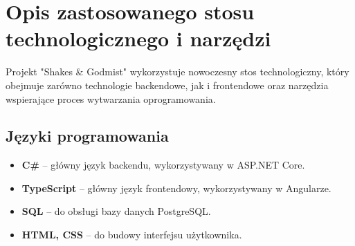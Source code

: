 \chapter{Opis zastosowanego stosu technologicznego i narzędzi}

Projekt "Shakes \& Godmist" wykorzystuje nowoczesny stos technologiczny, który obejmuje zarówno technologie backendowe, jak i frontendowe oraz narzędzia wspierające proces wytwarzania oprogramowania.

\section{Języki programowania}
\begin{itemize}
    \item \textbf{C\#} -- główny język backendu, wykorzystywany w ASP.NET Core.
    \item \textbf{TypeScript} -- główny język frontendowy, wykorzystywany w Angularze.
    \item \textbf{SQL} -- do obsługi bazy danych PostgreSQL.
    \item \textbf{HTML, CSS} -- do budowy interfejsu użytkownika.
\end{itemize}

